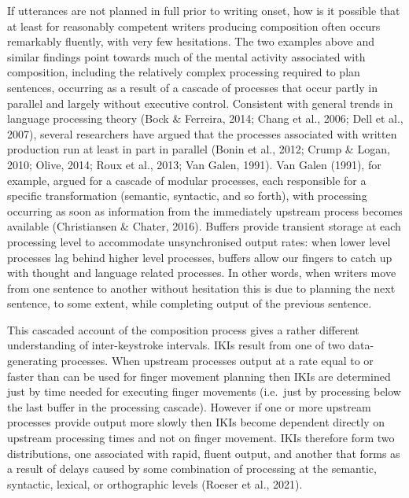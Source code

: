 \documentclass[
  man,floatsintext]{apa7}
\begin{document}
If utterances are not planned in full prior to writing onset, how is it possible that at least for reasonably competent writers producing composition often occurs remarkably fluently, with very few hesitations. The two examples above and similar findings point towards much of the mental activity associated with composition, including the relatively complex processing required to plan sentences, occurring as a result of a cascade of processes that occur partly in parallel and largely without executive control. Consistent with general trends in language processing theory (Bock \& Ferreira, 2014; Chang et al., 2006; Dell et al., 2007), several researchers have argued that the processes associated with written production run at least in part in parallel (Bonin et al., 2012; Crump \& Logan, 2010; Olive, 2014; Roux et al., 2013; Van Galen, 1991). Van Galen (1991), for example, argued for a cascade of modular processes, each responsible for a specific transformation (semantic, syntactic, and so forth), with processing occurring as soon as information from the immediately upstream process becomes available (Christiansen \& Chater, 2016). Buffers provide transient storage at each processing level to accommodate unsynchronised output rates: when lower level processes lag behind higher level processes, buffers allow our fingers to catch up with thought and language related processes. In other words, when writers move from one sentence to another without hesitation this is due to planning the next sentence, to some extent, while completing output of the previous sentence.

This cascaded account of the composition process gives a rather different understanding of inter-keystroke intervals. IKIs result from one of two data-generating processes. When upstream processes output at a rate equal to or faster than can be used for finger movement planning then IKIs are determined just by time needed for executing finger movements (i.e.~just by processing below the last buffer in the processing cascade). However if one or more upstream processes provide output more slowly then IKIs become dependent directly on upstream processing times and not on finger movement. IKIs therefore form two distributions, one associated with rapid, fluent output, and another that forms as a result of delays caused by some combination of processing at the semantic, syntactic, lexical, or orthographic levels (Roeser et al., 2021).
\end{document}

